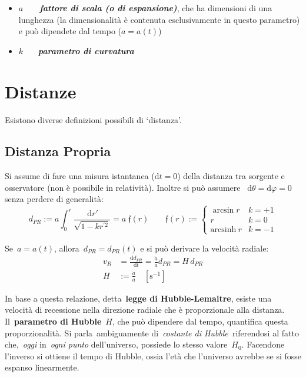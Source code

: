 \begin{itemize}
\item
  \(a\)~~~~\textbf{\emph{fattore di scala (o di
  espansione)}}, che ha dimensioni di una lunghezza (la dimensionalità è
  contenuta esclusivamente in questo parametro) e può dipendete dal
  tempo (\(a=a\left(t\right)\))
\item
  \(k\)~ ~~\textbf{\emph{parametro di curvatura}}
\end{itemize}


\section{Distanze}\label{1:sec2distanze}

Esistono diverse definizioni possibili di `distanza'.

\subsection{Distanza Propria}
Si assume di fare una misura istantanea (\(\mathrm{d}t=0\)) della
distanza tra sorgente e osservatore (non è possibile in relatività).
Inoltre si può assumere~ \(\mathrm{d}\theta=\mathrm{d}\varphi=0\) senza perdere di generalità:
\begin{equation}
    d_{PR}:=a\int_{0}^{r}\frac{\,\mathrm{d}r'}{\sqrt{1-kr^{'2}}}=a\; \mathfrak{f}(r) \qquad \mathfrak{f}(r):=\left\{\begin{matrix}
\arcsin r& k=+1\\ 
r & k=0\\ 
\mathrm{arcsinh}\:  r & k=-1
\end{matrix}\right.
\end{equation}

Se~\(a=a\left(t\right)\), allora~\(d_{PR}=d_{PR}(t)\) e si può derivare la
velocità radiale:
\begin{align*}
v_R & =\frac{\mathrm{d}d_{PR}}{\mathrm{d}t}=\frac{\dot{a}}{a}d_{PR}=H\,d_{PR}  \\
H & :=\frac{\dot{a}}{a}\quad [\mathrm{s^{-1}}]
\end{align*}

In base a questa relazione, detta~\textbf{legge di Hubble-Lemaitre},
esiste una velocità di recessione nella direzione radiale che è
proporzionale alla distanza. Il~\textbf{parametro di
Hubble}~\(H\), che può dipendere dal tempo, quantifica
questa proporzionalità. Si parla~ambiguamente di~\emph{costante di
Hubble~}riferendosi al fatto che,~\emph{oggi} in~\emph{ogni punto}
dell'universo, possiede lo stesso valore~\(H_0\). Facendone
l'inverso si ottiene il tempo di Hubble, ossia l'età che l'universo
avrebbe se si fosse espanso linearmente.

